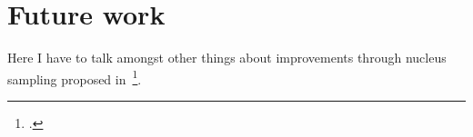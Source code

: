 \section{Future work}
\label{ch:future_work}

Here I have to talk amongst other things about improvements through nucleus sampling proposed in~\footcite{DBLP:journals/corr/abs-1904-09751}.